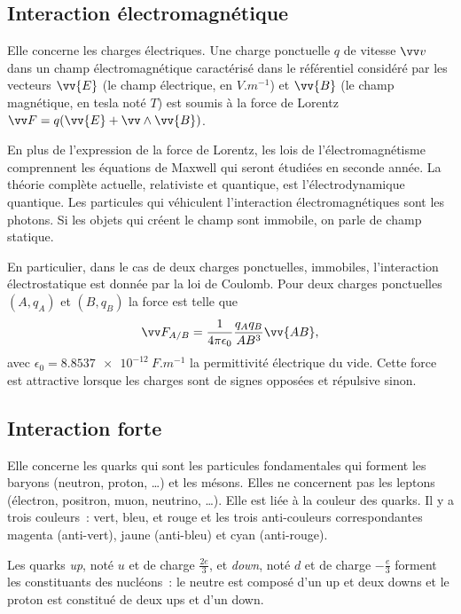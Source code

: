 \subsection{Interaction électromagnétique}
\label{chap2-subsec:interactionelectromagnetique}

Elle concerne les charges électriques. Une charge ponctuelle \(q\) de vitesse
\(\vvv\) dans un champ électromagnétique caractérisé dans le référentiel
considéré par les vecteurs \(\vv{E}\) (le champ électrique, en \(\si{V.m^{-1}}\))
et \(\vv{B}\) (le champ magnétique, en tesla noté \(\si{T}\)) est soumis à la
force de Lorentz \(\vF = q(\vv{E}+\vv \wedge \vv{B})\).

En plus de l'expression de la force de Lorentz, les lois de
l'électromagnétisme comprennent les équations de Maxwell qui seront étudiées
en seconde année. La théorie complète actuelle, relativiste et quantique, est
l'électrodynamique quantique. Les particules qui véhiculent l'interaction
électromagnétiques sont les photons. Si les objets qui créent le champ sont
immobile, on parle de champ statique.

En particulier, dans le cas de deux charges ponctuelles, immobiles,
l'interaction électrostatique est donnée par la loi de Coulomb. Pour deux
charges ponctuelles \((A, q_A)\) et \((B, q_B)\) la force est telle que
\begin{equation} \vF_{A/B} = \frac{1}{4\pi \epsilon_0} \frac{q_A q_B}{AB^3}
\vv{AB}, \end{equation} avec \(\epsilon_0 = \SI{8,8537e-12}{F.m^{-1}}\) la
permittivité électrique du vide. Cette force est attractive lorsque les
charges sont de signes opposées et répulsive sinon.

\subsection{Interaction forte}
\label{chap2-subsec:interactionforte}

Elle concerne les quarks qui sont les particules fondamentales qui forment
les baryons (neutron, proton, \ldots) et les mésons. Elles ne concernent pas
les leptons (électron, positron, muon, neutrino, \ldots). Elle est liée à la
couleur des quarks. Il y a trois couleurs~: vert, bleu, et rouge et les trois
anti-couleurs correspondantes magenta (anti-vert), jaune (anti-bleu) et cyan
(anti-rouge).

Les quarks \emph{up}, noté \(u\) et de charge \(\frac{2e}{3}\), et \emph{down},
noté \(d\) et de charge \(-\frac{e}{3}\) forment les constituants des nucléons~:
le neutre est composé d'un up et deux downs et le proton est constitué de
deux ups et d'un down.

